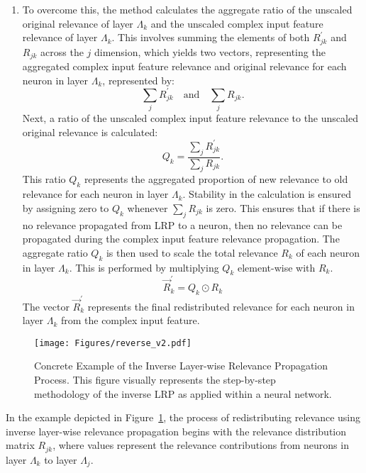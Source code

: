\begin{enumerate}
\item To overcome this, the method calculates the aggregate ratio of the unscaled original relevance of layer $\Lambda_k$ and the unscaled complex input feature relevance of layer $\Lambda_k$. This involves summing the elements of both \( R_{jk}^\prime \) and \( R_{jk} \) across the \( j \) dimension, which yields two vectors, representing the aggregated complex input feature relevance and original relevance for each neuron in layer \( \Lambda_k \), represented by:
\begin{equation*}
\sum_{j} R_{jk}^\prime \quad \text{and} \quad \sum_{j} R_{jk}.
\end{equation*}
Next, a ratio of the unscaled complex input feature relevance to the unscaled original relevance is calculated:
\begin{equation*}
  Q_{k} = \frac{\sum_{j} R_{jk}^\prime}{\sum_{j} R_{jk}}.
\end{equation*}
This ratio \( Q_{k} \) represents the aggregated proportion of new relevance to old relevance for each neuron in layer \( \Lambda_k \). Stability in the calculation is ensured by assigning zero to $Q_{k}$ whenever \( \sum_{j} R_{jk} \) is zero. This ensures that if there is no relevance propagated from LRP to a neuron, then no relevance can be propagated during the complex input feature relevance propagation. The aggregate ratio \( Q_{k} \) is then used to scale the total relevance \( R_k \) of each neuron in layer \( \Lambda_k \). This is performed by multiplying \( Q_{k} \) element-wise with \( R_k \).
\begin{equation*}
    \vec{R}_k^\prime = Q_{k} \odot R_{k}
\end{equation*}
The vector \( \vec{R}_k^\prime \) represents the final redistributed relevance for each neuron in layer \( \Lambda_k \) from the complex input feature.

\end{enumerate}

\begin{figure}[ht!]
\begin{center}
\texttt{[image: Figures/reverse\_v2.pdf]}
\end{center}
\caption{Concrete Example of the Inverse Layer-wise Relevance Propagation Process. This figure visually represents the step-by-step methodology of the inverse LRP as applied within a neural network.}
\label{Fig:Reverse_LRP_2}
\end{figure} 

In the example depicted in Figure~\ref{Fig:Reverse_LRP_2}, the process of redistributing relevance using inverse layer-wise relevance propagation begins with the relevance distribution matrix \(R_{jk}\), where values represent the relevance contributions from neurons in layer \(\Lambda_k\) to layer \(\Lambda_j\). 

